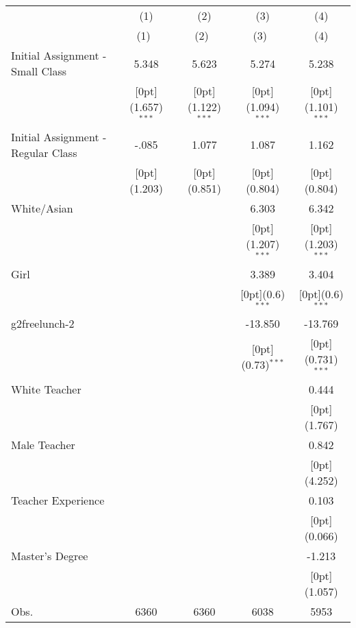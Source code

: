 \begin{tabular*}{\textwidth}{@{\extracolsep{\fill}}lcccc}				
	& \multicolumn{1}{c}{(1)} &	\multicolumn{1}{c}{(2)} &	\multicolumn{1}{c}{(3)} &	\multicolumn{1}{c}{(4)} \\
\cline{2-5}				
	& \multicolumn{1}{c}{(1)\mbox{\ }} &	\multicolumn{1}{c}{(2)\mbox{\ }} &	\multicolumn{1}{c}{(3)\mbox{\ }} &	\multicolumn{1}{c}{(4)} \\
\hline				
Initial Assignment - Small Class &	5.348 &	5.623 &	5.274 &	5.238 \\
&	\raisebox{.7ex}[0pt]{\scriptsize (1.657)$^{***}$} &	\raisebox{.7ex}[0pt]{\scriptsize (1.122)$^{***}$} &	\raisebox{.7ex}[0pt]{\scriptsize (1.094)$^{***}$} &	\raisebox{.7ex}[0pt]{\scriptsize (1.101)$^{***}$} \\
Initial Assignment - Regular Class &	-.085 &	1.077 &	1.087 &	1.162 \\
&	\raisebox{.7ex}[0pt]{\scriptsize (1.203)} &	\raisebox{.7ex}[0pt]{\scriptsize (0.851)} &	\raisebox{.7ex}[0pt]{\scriptsize (0.804)} &	\raisebox{.7ex}[0pt]{\scriptsize (0.804)} \\
White/Asian &	&	&	6.303 &	6.342 \\
&	&	&	\raisebox{.7ex}[0pt]{\scriptsize (1.207)$^{***}$} &	\raisebox{.7ex}[0pt]{\scriptsize (1.203)$^{***}$} \\
Girl &	&	&	3.389 &	3.404 \\
&	&	&	\raisebox{.7ex}[0pt]{\scriptsize (0.6)$^{***}$} &	\raisebox{.7ex}[0pt]{\scriptsize (0.6)$^{***}$} \\
g2freelunch-2 &	&	&	-13.850 &	-13.769 \\
&	&	&	\raisebox{.7ex}[0pt]{\scriptsize (0.73)$^{***}$} &	\raisebox{.7ex}[0pt]{\scriptsize (0.731)$^{***}$} \\
White Teacher &	&	&	&	0.444 \\
&	&	&	&	\raisebox{.7ex}[0pt]{\scriptsize (1.767)} \\
Male Teacher &	&	&	&	0.842 \\
&	&	&	&	\raisebox{.7ex}[0pt]{\scriptsize (4.252)} \\
Teacher Experience &	&	&	&	0.103 \\
&	&	&	&	\raisebox{.7ex}[0pt]{\scriptsize (0.066)} \\
Master's Degree &	&	&	&	-1.213 \\
&	&	&	&	\raisebox{.7ex}[0pt]{\scriptsize (1.057)} \\
Obs. &	6360 &	6360 &	6038 &	5953 \\
\hline\hline				
\end{tabular*}%
